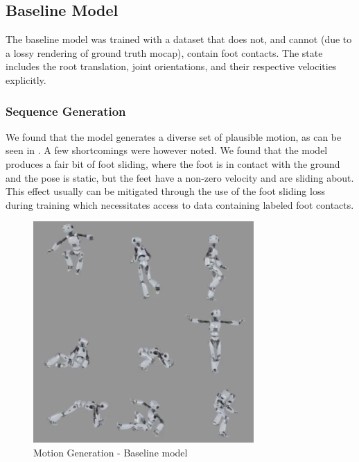 \subsection{Baseline Model}
\label{sec:baseline_evaluation}
The baseline model was trained with a dataset that does not, and cannot (due to a lossy rendering of ground truth mocap), contain foot contacts. The state includes the root translation, joint orientations, and their respective velocities explicitly.

\subsubsection{Sequence Generation}
We found that the model generates a diverse set of plausible motion, as can be seen in . A few shortcomings were however noted. We found that the model produces a fair bit of foot sliding, where the foot is in contact with the ground and the pose is static, but the feet have a non-zero velocity and are sliding about. This effect usually can be mitigated through the use of the foot sliding loss during training which necessitates access to data containing labeled foot contacts.

\begin{figure}[!ht]
    \centering
    \includegraphics[width=0.75\textwidth]{Figures/diffusion/results/baseline_generation.png}
    \caption{Motion Generation - Baseline model}
    \label{fig:baseline_generation}
\end{figure}

